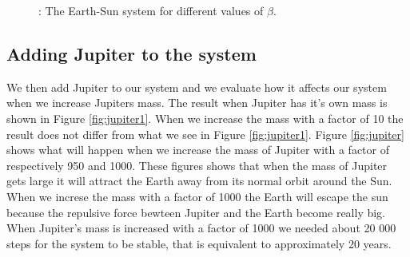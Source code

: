 \documentclass{article}
\begin{document}
\begin{figure}[H]
    \caption{: The Earth-Sun system for different values of $\beta$.}
    \label{fig:beta}
    \end{figure}

\subsection{Adding Jupiter to the system}
We then add Jupiter to our system and we evaluate how it affects our system when we increase Jupiters mass. The result when Jupiter has it's own mass is shown in Figure \ref{fig:jupiter1}. When we increase the mass with a factor of 10 the result does not differ from what we see in Figure \ref{fig:jupiter1}. Figure \ref{fig:jupiter} shows what will happen when we increase the mass of Jupiter with a factor of respectively 950 and 1000. These figures shows that when the mass of Jupiter gets large it will attract the Earth away from its normal orbit around the Sun. When we increse the mass with a factor of 1000 the Earth will escape the sun because the repulsive force bewteen Jupiter and the Earth become really big. When Jupiter's mass is increased with a factor of 1000 we needed about 20 000 steps for the system to be stable, that is equivalent to approximately 20 years.
\end{document}
